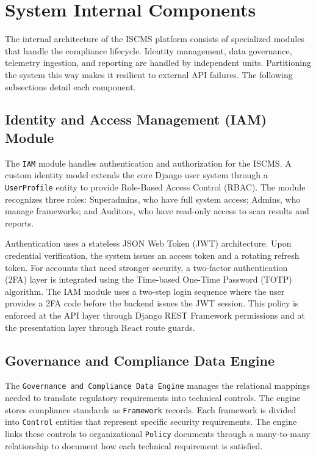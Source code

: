 \section{System Internal Components}
The internal architecture of the ISCMS platform consists of specialized modules that handle the compliance lifecycle. Identity management, data governance, telemetry ingestion, and reporting are handled by independent units. Partitioning the system this way makes it resilient to external API failures. The following subsections detail each component.

\subsection{Identity and Access Management (IAM) Module}
The \texttt{IAM} module handles authentication and authorization for the ISCMS. A custom identity model extends the core Django user system through a \texttt{UserProfile} entity to provide Role-Based Access Control (RBAC). The module recognizes three roles: Superadmins, who have full system access; Admins, who manage frameworks; and Auditors, who have read-only access to scan results and reports.

Authentication uses a stateless JSON Web Token (JWT) architecture. Upon credential verification, the system issues an access token and a rotating refresh token. For accounts that need stronger security, a two-factor authentication (2FA) layer is integrated using the Time-based One-Time Password (TOTP) algorithm. The IAM module uses a two-step login sequence where the user provides a 2FA code before the backend issues the JWT session. This policy is enforced at the API layer through Django REST Framework permissions and at the presentation layer through React route guards.

\subsection{Governance and Compliance Data Engine}
The \texttt{Governance and Compliance Data Engine} manages the relational mappings needed to translate regulatory requirements into technical controls. The engine stores compliance standards as \texttt{Framework} records. Each framework is divided into \texttt{Control} entities that represent specific security requirements. The engine links these controls to organizational \texttt{Policy} documents through a many-to-many relationship to document how each technical requirement is satisfied.

